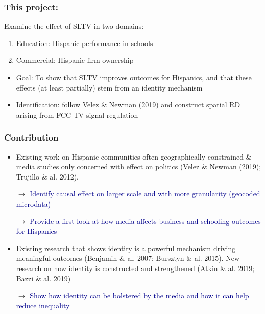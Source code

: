 \documentclass{beamer}
\begin{document}
\begin{frame}
\frametitle{This project:}

Examine the effect of SLTV in two domains:
\begin{enumerate}
\item Education: Hispanic performance in schools
\item Commercial: Hispanic firm ownership
\end{enumerate}

\begin{itemize}
\item Goal: To show that SLTV improves outcomes for Hispanics, and that these effects (at least partially) stem from an identity mechanism

\pause

\item Identification: follow Velez \& Newman (2019) and construct spatial RD arising from FCC TV signal regulation
\end{itemize}

\end{frame}


\begin{frame}
\frametitle{Contribution}
\begin{itemize}

\item Existing work on Hispanic communities often geographically constrained \& media studies only concerned with effect on politics  {\footnotesize (Velez \& Newman (2019); Trujillo \& al. 2012)}. 
\item[$\rightarrow $] \textcolor{darkblue}{Identify causal effect on larger scale and with more granularity (geocoded microdata)}

\item[$\rightarrow $] \textcolor{darkblue}{Provide a first look at how media affects business and schooling outcomes for Hispanics}

\item Existing research that shows identity is a powerful mechanism driving meaningful outcomes {\footnotesize (Benjamin \& al. 2007; Bursztyn \& al. 2015)}. New research on how identity is constructed and strengthened {\footnotesize (Atkin \& al. 2019; Bazzi \& al. 2019)}

\item[$\rightarrow $] \textcolor{darkblue}{Show how identity can be bolstered by the media and how it can help reduce inequality}

\end{itemize}

\end{frame}
\end{document}
